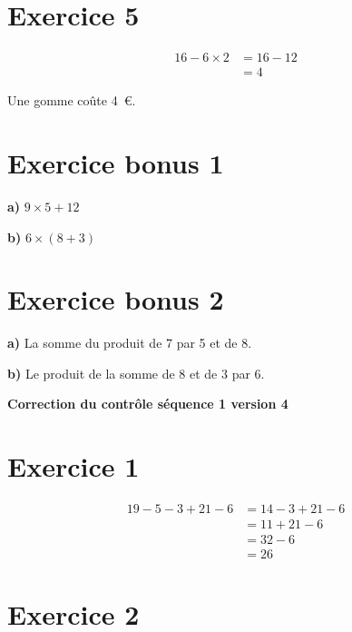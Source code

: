 \documentclass[12pt]{extarticle}
\begin{document}
\section*{Exercice 5}
\begin{align*}
16 - 6 \times 2 &= 16 - 12 \\
                &= 4
\end{align*}

Une gomme coûte 4~€.

\section*{Exercice bonus 1}

\textbf{a)} $9 \times 5 + 12$

\textbf{b)} $6 \times (8 + 3)$

\section*{Exercice bonus 2}

\textbf{a)} La somme du produit de 7 par 5 et de 8.

\textbf{b)} Le produit de la somme de 8 et de 3 par 6.

\newpage

\begin{center}
\Large\textbf{Correction du contrôle séquence 1 version 4}
\end{center}

\section*{Exercice 1}
\begin{align*}
19 - 5 - 3 + 21 - 6 &= 14 - 3 + 21 - 6 \\
                     &= 11 + 21 - 6 \\
                     &= 32 - 6 \\
                     &= 26
\end{align*}

\section*{Exercice 2}
\end{document}
